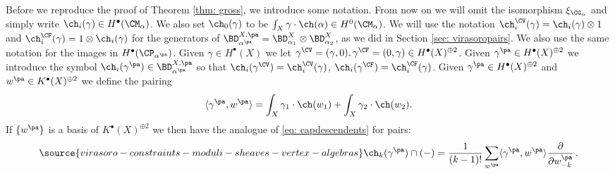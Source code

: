 Before we reproduce the proof of Theorem \ref{thm: gross}, we introduce some notation. From now on we will omit the isomorphism $\xi_{\CG_\alpha}$ and simply write $\ch_i(\gamma)\in H^\bullet(\CM_\alpha)$. We also set $\ch_0(\gamma)$ to be $\int_X \gamma\cdot \ch(\alpha)\in H^0(\CM_\alpha)$. We will use the notation $\ch_i^\CV(\gamma)=\ch_i(\gamma)\otimes 1$ and $\ch_i^\CF(\gamma)=1\otimes \ch_i(\gamma)$ for the generators of $\BD^{X, {\pa}}_{\alpha^{\pa}}=\BD^X_{\alpha_1}\otimes \BD^X_{\alpha_2}$, as we did in Section \ref{sec: virasoropairs}. We also use the same notation for the images in $H^\bullet(\CP_{\alpha^{\pa}})$. Given $\gamma\in H^\bullet(X)$ we let $\gamma^\CV=(\gamma, 0), \gamma^{\CF}=(0, \gamma)\in H^\bullet(X)^{\oplus 2}$. Given $\gamma^{\pa}\in H^\bullet(X)^{\oplus 2}$ we introduce the symbol $\ch_i(\gamma^{\pa})\in \BD^{X, {\pa}}_{\alpha^{\pa}}$ so that $\ch_i(\gamma^{\CV})=\ch_i^{\CV}(\gamma)$, $\ch_i(\gamma^{\CF})=\ch_i^{\CF}(\gamma)$. Given $\gamma^{\pa}\in H^\bullet(X)^{\oplus 2}$ and $w^{\pa}\in K^\bullet(X)^{\oplus 2}$ we define the pairing
\[\langle \gamma^{\pa}, w^{\pa} \rangle=\int_X \gamma_1\cdot \ch(w_1)+\int_X \gamma_2\cdot \ch(w_2).\]
If $\{w^{\pa}\}$ is a basis of $K^\bullet(X)^{\oplus 2}$ we then have the analogue of \eqref{eq: capdescendents} for pairs:
\begin{equation}
\label{eq: capdescendentspairs}
\source{virasoro-constraints-moduli-sheaves-vertex-algebras}
\ch_{k}(\gamma^{\pa})\cap(-)=\frac{1}{(k-1)!}\sum_{w^{\pa}}\langle \gamma^{\pa}, w^{\pa}\rangle\frac{\partial}{\partial w^{\pa}_{-k}}\,.
\end{equation}

